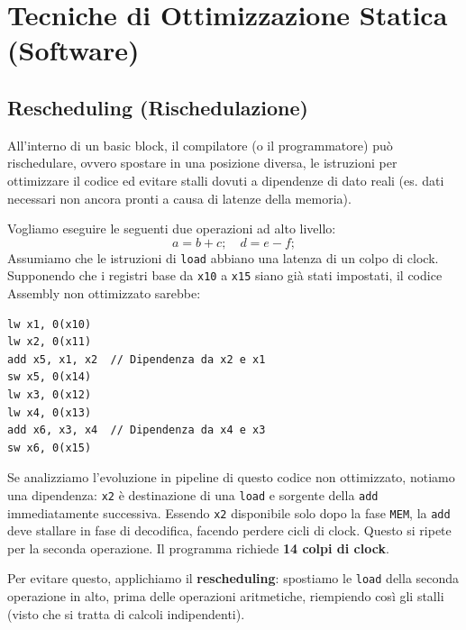 \section{Tecniche di Ottimizzazione Statica (Software)}

\subsection{Rescheduling (Rischedulazione)}
All'interno di un basic block, il compilatore (o il programmatore) può rischedulare, ovvero spostare in una posizione diversa, le istruzioni per ottimizzare il codice ed evitare stalli dovuti a dipendenze di dato reali (es. dati necessari non ancora pronti a causa di latenze della memoria).

\begin{example}
Vogliamo eseguire le seguenti due operazioni ad alto livello:
\[ a = b + c; \quad d = e - f; \]
Assumiamo che le istruzioni di \texttt{load} abbiano una latenza di un colpo di clock.
Supponendo che i registri base da \texttt{x10} a \texttt{x15} siano già stati impostati, il codice Assembly non ottimizzato sarebbe:

\begin{verbatim}
lw x1, 0(x10)
lw x2, 0(x11)
add x5, x1, x2  // Dipendenza da x2 e x1
sw x5, 0(x14)
lw x3, 0(x12)
lw x4, 0(x13)
add x6, x3, x4  // Dipendenza da x4 e x3
sw x6, 0(x15)
\end{verbatim}
\end{example}

Se analizziamo l'evoluzione in pipeline di questo codice non ottimizzato, notiamo una dipendenza: \texttt{x2} è destinazione di una \texttt{load} e sorgente della \texttt{add} immediatamente successiva. Essendo \texttt{x2} disponibile solo dopo la fase \texttt{MEM}, la \texttt{add} deve stallare in fase di decodifica, facendo perdere cicli di clock. Questo si ripete per la seconda operazione. Il programma richiede \textbf{14 colpi di clock}.

Per evitare questo, applichiamo il \textbf{rescheduling}: spostiamo le \texttt{load} della seconda operazione in alto, prima delle operazioni aritmetiche, riempiendo così gli stalli (visto che si tratta di calcoli indipendenti).

